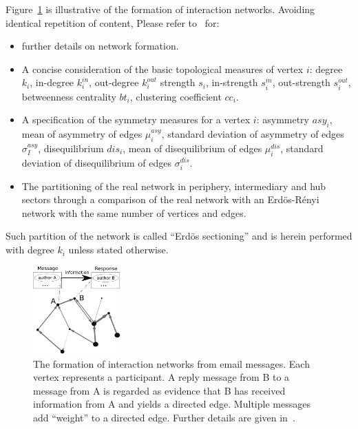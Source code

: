 \documentclass[%
 aip,
 jmp,%
 amsmath,amssymb,
 reprint,%
]{revtex4-1}
\begin{document}
Figure~\ref{fig:formation} is illustrative of the formation of interaction networks.
Avoiding identical repetition of content,
Please refer to~\cite{evoSN} for:
\begin{itemize}
	\item further details on network formation.
	\item A concise consideration of the basic topological measures of vertex $i$: degree $k_i$, in-degree $k_i^{in}$, out-degree $k_i^{out}$ strength $s_i$, in-strength $s_i^{in}$, out-strength $s_i^{out}$, betweenness centrality $bt_i$, clustering coefficient $cc_i$.
	\item A specification of the symmetry measures for a vertex $i$:
		asymmetry $asy_i$, mean of asymmetry of edges $\mu_i^{asy}$, standard deviation of asymmetry of edges $\sigma_I^{asy}$, disequilibrium $dis_i$, mean of disequilibrium of edges $\mu_i^{dis}$, standard deviation of disequilibrium of edges $\sigma_i^{dis}$.
	\item The partitioning of the real network in periphery, intermediary and hub sectors through a comparison of the real network with an Erd\"os-R\'enyi network with the same number of vertices and edges. 
\end{itemize}
Such partition of the network is called ``Erd\"os sectioning'' and is
herein performed with degree $k_i$ unless stated otherwise.

\begin{figure}[!h]
	\centering
	\includegraphics[width=0.3\textwidth]{figs/criaRede__}
	\caption{The formation of interaction networks from email messages. Each vertex represents a participant. A reply message from B to a message from A is regarded as evidence that B has received information from A and yields a directed edge. Multiple messages add ``weight'' to a directed edge. Further details are given in~\cite{evoSN}.}
	\label{fig:formation}
\end{figure}
\end{document}
